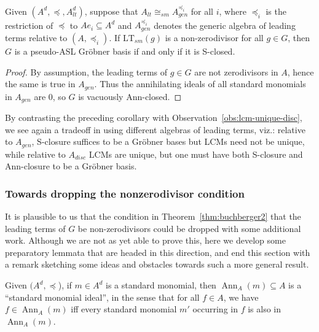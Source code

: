 \documentclass[11pt,reqno]{amsart}
\DeclareMathOperator{\Ann}{Ann}
\newcommand{\ltsm}{\text{LT}_{sm}}
\theoremstyle{definition}
\numberwithin{equation}{section}
\begin{document}
\begin{corollary}
\label{cor:buchberger-agen}
Given $(A^d, \preceq, A_{lt}^d)$, suppose that $A_{lt} \cong_{sm} A_{gen}^{\preceq_i}$ for all $i$, where $\preceq_i$ is the restriction of $\preceq$ to $A e_i \subseteq A^d$ and $A_{gen}^{\preceq_i}$ denotes the generic algebra of leading terms relative to $(A,\preceq_i)$. If $\ltsm(g)$ is a non-zerodivisor for all $g \in G$, then $G$ is a pseudo-ASL Gröbner basis if and only if it is S-closed.
\end{corollary}

\begin{proof}
By assumption, the leading terms of $g \in G$ are not zerodivisors in $A$, hence the same is true in $A_{gen}$. Thus the annihilating ideals of all standard monomials in $A_{gen}$ are 0, so $G$ is vacuously Ann-closed.
\end{proof}

By contrasting the preceding corollary with Observation~\ref{obs:lcm-unique-disc}, we see again a tradeoff in using different algebras of leading terms, viz.: relative to $A_{gen}$, S-closure suffices to be a Gröbner bases but LCMs need not be unique, while relative to $A_{disc}$ LCMs are unique, but one must have both S-closure and Ann-closure to be a Gröbner basis.

\subsubsection{Towards dropping the nonzerodivisor condition}
It is plausible to us that the condition in Theorem~\ref{thm:buchberger2} that the leading terms of $G$ be non-zerodivisors could be dropped with some additional work. Although we are not as yet able to prove this, here we develop some preparatory lemmata that are headed in this direction, and end this section with a remark sketching some ideas and obstacles towards such a more general result.

\begin{lemma} \label{lem:ann-monomial}
Given $(A^d, \preceq$), if $m \in A^d$ is a standard monomial, then $\Ann_A(m) \subseteq A$ is a ``standard monomial ideal'', in the sense that for all $f \in A$, we have $f \in \Ann_A(m)$ iff every standard monomial $m'$ occurring in $f$ is also in $\Ann_A(m)$.
\end{lemma}
\end{document}
